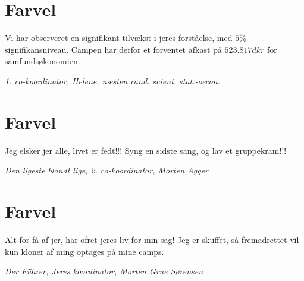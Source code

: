 \begin{minipage}[b]{0.95\linewidth}
\begin{minipage}[t]{0.47\textwidth}
%

\section*{Farvel}
Vi har observeret en signifikant tilvækst i jeres forståelse, med $5\%$ signifikansniveau. Campen har derfor et forventet afkast på $523.817 dkr$ for samfundsøkonomien.

{\flushright\emph{1. co-koordinator, Helene, næsten cand. scient. stat.-oecon.}}

\section*{Farvel}
Jeg elsker jer alle, livet er fedt!!! Syng en sidste sang, og lav et gruppekram!!!

{\flushright\emph{Den ligeste blandt lige, 2. co-koordinator, Morten Agger}}

\section*{Farvel}
Alt for få af jer, har ofret jeres liv for min sag! Jeg er skuffet, så fremadrettet vil kun kloner af ming optages på mine camps. 

{\flushright\emph{Der Führer, Jeres koordinator, Morten Grue Sørensen}}


\end{minipage}
\end{minipage}
